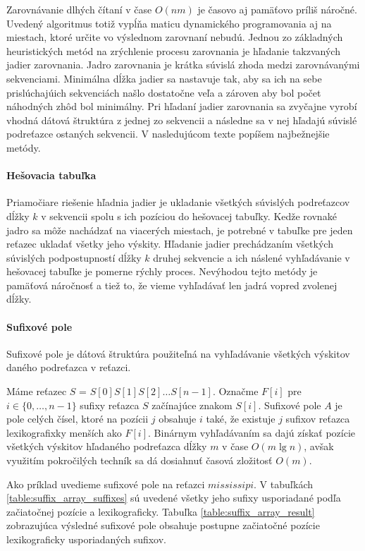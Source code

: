 Zarovnávanie dlhých čítaní v čase $O(nm)$ je časovo aj pamäťovo príliš náročné. Uvedený algoritmus totiž vypĺňa maticu dynamického programovania aj na miestach, ktoré určite vo výslednom zarovnaní nebudú. Jednou zo základných heuristických metód na zrýchlenie procesu zarovnania je hľadanie takzvaných jadier zarovnania. Jadro zarovnania je krátka súvislá zhoda medzi zarovnávanými sekvenciami. Minimálna dĺžka jadier sa nastavuje tak, aby sa ich na sebe prislúchajúich sekvenciách našlo dostatočne veľa a zároven aby bol počet náhodných zhôd bol minimálny. Pri hľadaní jadier zarovnania sa zvyčajne vyrobí vhodná dátová štruktúra z jednej zo sekvencii a následne sa v nej hľadajú súvislé podreťazce ostaných sekvencii. V nasledujúcom texte popíšem najbežnejšie metódy.

\paragraph{Hešovacia tabuľka}

Priamočiare riešenie hľadnia jadier je ukladanie všetkých súvislých podreťazcov dĺžky $k$ v sekvencii spolu s ich pozíciou do hešovacej tabuľky. Kedže rovnaké jadro sa môže nachádzať na viacerých miestach, je potrebné v tabuľke pre jeden reťazec ukladať všetky jeho výskity. Hľadanie jadier prechádzaním všetkých súvislých podpostupností dĺžky $k$ druhej sekvencie a ich náslené vyhľadávanie v hešovacej tabuľke je pomerne rýchly proces. Nevýhodou tejto metódy je pamäťová náročnosť a tiež to, že vieme vyhľadávať len jadrá vopred zvolenej dĺžky.

\paragraph{Sufixové pole}

Sufixové pole je dátová štruktúra použiteľná na vyhľadávanie všetkých výskitov daného podreťazca v reťazci.

Máme reťazec $S$ = $S[0]S[1]S[2]\dots S[n-1]$. Označme $F[i]$ pre $i \in \{0, \dots , n - 1 \}$ sufixy reťazca $S$ začínajúce znakom $S[i]$. Sufixové pole $A$ je pole celých čísel, ktoré na pozícii $j$ obsahuje $i$ také, že existuje $j$ sufixov reťazca lexikografixky menších ako $F[i]$. Binárnym vyhľadávaním sa dajú získať pozície všetkých výskitov hľadaného podreťazca dĺžky $m$ v čase $O(m\lg n)$, avšak využitím pokročilých techník sa dá dosiahnuť časová zložitosť $O(m)$.

Ako príklad uvedieme sufixové pole na reťazci $mississipi$. V tabuľkách \ref{table:suffix_array_suffixes} sú uvedené všetky jeho sufixy usporiadané podľa začiatočnej pozície a lexikograficky. Tabuľka \ref{table:suffix_array_result} zobrazujúca výsledné sufixové pole obsahuje postupne začiatočné pozície lexikograficky usporiadaných sufixov.

